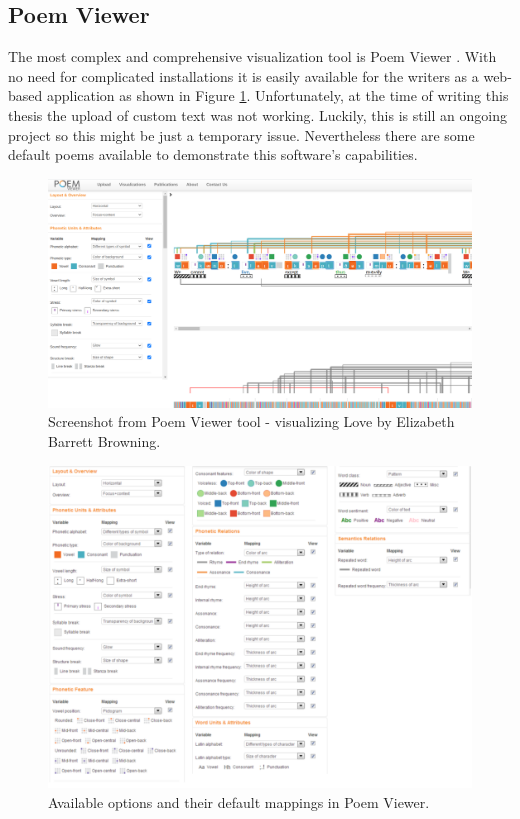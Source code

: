 \subsection{Poem Viewer}
The most complex and comprehensive visualization tool is Poem Viewer \cite{Abdul2013}. With no need for complicated installations it is easily available for the writers as a web-based application as shown in Figure \ref{screenshotPV}. Unfortunately, at the time of writing this thesis the upload of custom text was not working. Luckily, this is still an ongoing project so this might be just a temporary issue. Nevertheless there are some default poems available to demonstrate this software's capabilities.
\begin{figure}[h]\centering
	\includegraphics[scale=0.24]{../img/ScreenshotPV.png}
	\caption{Screenshot from Poem Viewer tool - visualizing Love by Elizabeth Barrett Browning.}\label{screenshotPV}
\end{figure}

\begin{figure}[h]\centering
	\includegraphics[scale=0.4]{../img/snapshotPV_options.pdf}
	\caption{Available options and their default mappings in Poem Viewer.}\label{screenshotPV-options}
\end{figure}

